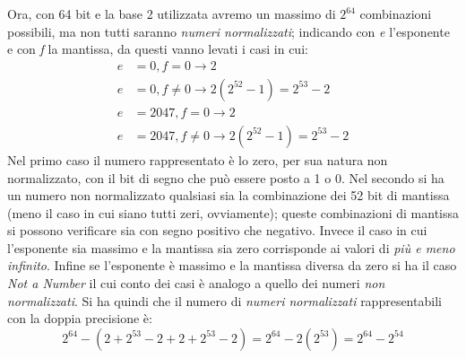 \documentclass[a4paper]{report}
\begin{document}
Ora, con 64 bit e la base 2 utilizzata avremo un massimo di $2^{64}$ combinazioni possibili, ma non tutti saranno \emph{numeri normalizzati}; indicando con \emph{e} l'esponente e con \emph{f} la mantissa, da questi vanno levati i casi in cui:
\[
\begin{aligned}
e &=0, f=0 \rightarrow 2 \\
e &=0, f\neq0\rightarrow 2(2^{52}-1)=2^{53}-2 \\
e &=2047, f=0\rightarrow 2 \\
e &=2047, f\neq0\rightarrow  2(2^{52}-1)=2^{53}-2
\end{aligned}
\]
Nel primo caso il numero rappresentato è lo zero, per sua natura non normalizzato, con il bit di segno che può essere posto a 1 o 0. Nel secondo si ha un numero non normalizzato qualsiasi sia la combinazione dei 52 bit di mantissa (meno il caso in cui siano tutti zeri, ovviamente); queste combinazioni di mantissa si possono verificare sia con segno positivo che negativo. Invece il caso in cui l'esponente sia massimo e la mantissa sia zero corrisponde ai valori di \emph{più e meno infinito}. Infine se l'esponente è massimo e la mantissa diversa da zero si ha il caso \emph{Not a Number} il cui conto dei casi è analogo a quello dei numeri \emph{non normalizzati}.
Si ha quindi che il numero di \emph{numeri normalizzati} rappresentabili con la doppia precisione è:
\[
2^{64}-(2+2^{53}-2+2+2^{53}-2)=2^{64}-2(2^{53})=2^{64}-2^{54}
\]
\\
\end{document}
